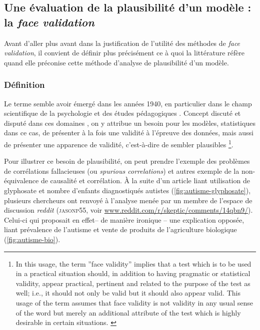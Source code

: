 \subsection{Une évaluation de la plausibilité d'un modèle : la \og \textit{face validation}\fg{}}\label{subsec:face-validity}

Avant d'aller plus avant dans la justification de l'utilité des méthodes de \textit{face validation}, il convient de définir plus précisément ce à quoi la littérature réfère quand elle préconise cette méthode d'analyse de plausibilité d'un modèle.

\subsubsection{Définition}
Le terme semble avoir émergé dans les années 1940, en particulier dans le champ scientifique de la psychologie et des études pédagogiques \autocite{nevo_face_1985}.
Concept discuté et disputé dans ces domaines \autocite{mosier_critical_1947}, on y attribue un besoin pour les modèles, statistiques dans ce cas, de présenter à la fois une validité à l'épreuve des données, mais aussi de présenter une apparence de validité, c'est-à-dire de sembler plausibles
\footnote{
	\og In this usage, the term ''face validity'' implies that a test which is to be used in a practical situation should, in addition to having pragmatic or statistical validity, appear practical, pertinent and related to the purpose of the test as well; i.e., it should not only be valid but it should also appear valid. This usage of the term assumes that \og face validity\fg{} is not validity in any usual sense of the word but merely an additional attribute of the test which is highly desirable in certain situations.\fg{} \cite[192]{mosier_critical_1947}
}.

Pour illustrer ce besoin de \og plausibilité\fg{}, on peut prendre l'exemple des problèmes de corrélations fallacieuses (ou \og \textit{spurious correlations}\fg{}) et autres exemple de la non-équivalence de causalité et corrélation.
À la suite d'un article \autocite{shaw_elevated_2017} liant utilisation de glyphosate et nombre d'enfants diagnostiqués autistes (\cref{fig:autisme-glyphosate}), plusieurs chercheurs ont renvoyé à l'analyse menée par un membre de l'espace de discussion \textit{reddit} (\textsc{jasonp55}, voir \href{https://www.reddit.com/r/skeptic/comments/14qbn9/rskeptic_i_was_practicing_graphpad_and_i_think_i/}{www.reddit.com/r/skeptic/comments/14qbn9/}).
Celui-ci qui proposait en effet-- de manière ironique -- une explication opposée, liant prévalence de l'autisme et vente de produits de  l'agriculture biologique (\cref{fig:autisme-bio}).


